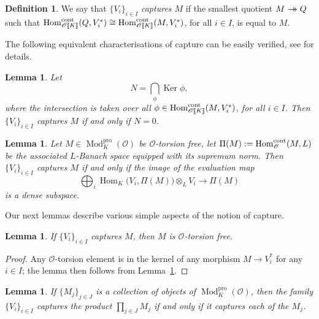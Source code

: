 \documentclass[JEP,XML,SOM,Unicode,NoEqCountersInSection]{cedram}
\let\mathcal\mathscr
\newcommand{\onto}{\mathchoice{\to\hspace*{-5mm}\to}{\to\hspace*{-2.85mm}\to}{\to\hspace*{-3mm}\to}{\to\hspace*{-3mm}\to}}
\newtheorem{lem}[prop]{Lemma}
\theoremstyle{definition}
\newtheorem{defi}[prop]{Definition}
\DeclareMathOperator{\Hom}{Hom}
\DeclareMathOperator{\Ker}{Ker}
\DeclareMathOperator{\Mod}{Mod}
\newcommand{\br}[1]{[\![#1]\!]}
\newcommand{\cO}{\mathcal{O}}
\newcommand{\pro}{\mathrm{pro}}
\begin{document}
\begin{defi}\label{defi_capture}We say
that $\{V_i\}_{i\in I}$ \textit{captures $M$} if the smallest quotient
$M\onto Q$ such that
$\Hom_{\cO\br{K}}^{\rm cont}(Q, V_i^*)\cong \Hom_{\cO\br{K}}^{\rm cont}(M, V_i^*)$, for all $i\in I$, is equal to $M$.
\end{defi}

The following equivalent characterisations of capture can be easily verified, see \cite[\S 2.4]{CDP} for details.

\begin{lem}\label{intersect} Let
\[
N=\bigcap_{\phi} \Ker \phi,
\]
where the intersection is taken over all
$\phi\in \Hom_{\cO\br{K}}^{\rm cont}(M, V_i^*)$, for all $i\in I$.
Then $\{V_i\}_{i\in I}$ captures $M$ if and only if $N=0$.
\end{lem}

\begin{lem}\label{capture_banach} Let $M\in \Mod^{\pro}_K(\cO)$ be $\cO$-torsion free, let $\Pi(M):=\Hom_{\cO}^{\rm cont}(M, L)$ be the associated
$L$-Banach space equipped with its supremum norm. Then
$\{V_i\}_{i\in I}$ captures $M$ if and only if the image of the evaluation map
\[
\bigoplus_i \Hom_K\bigl(V_i, \Pi(M)\bigr)\otimes_L V_i \longrightarrow \Pi(M)
\]
is a dense subspace.
\end{lem}

Our next lemmas describe various simple aspects of the notion of capture.

\begin{lem}
\label{torsion escapes}
If $\{V_i\}_{i \in I}$ captures $M$, then $M$ is $\cO$-torsion free.
\end{lem}

\begin{proof}
Any $\cO$-torsion element is in the kernel of any morphism $M\to V_i^*$
for any $i \in I$; the lemma then follows from Lemma~\ref{intersect}.
\end{proof}

\begin{lem}\label{capture_product}
If $\{M_j\}_{j \in J}$ is a collection of objects of
$\Mod^{\pro}_K(\cO)$,
then the family $\{V_i\}_{i \in I}$ captures the product $\prod_{j \in J}M_j$
if and only if it captures each of the $M_j$.
\end{lem}
\end{document}
